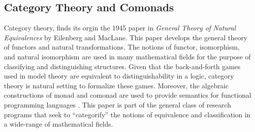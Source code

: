 \subsection{Category Theory and Comonads}
Category theory, finds its orgin the 1945 paper in \textit{General Theory of Natural Equivalences} by Eilenberg and MacLane. This paper develops the general theory of functors and natural transformations. The notions of functor, isomorphism, and natural isomorphism are used in many mathematical fields for the purpose of classifying and distinguishing structures. Given that the back-and-forth games used in model theory are equivalent to distinguishability in a logic, category theory is natural setting to formalize these games. Moreover, the algebraic constructions of monad and comonad are used to provide semantics for functional programming languages \cite{Moggi1991} \cite{BrookesGeva1992}. This paper is part of the general class of research programs that seek to ``categorify'' the notions of equivalence and classification in a wide-range of mathematical fields.   
